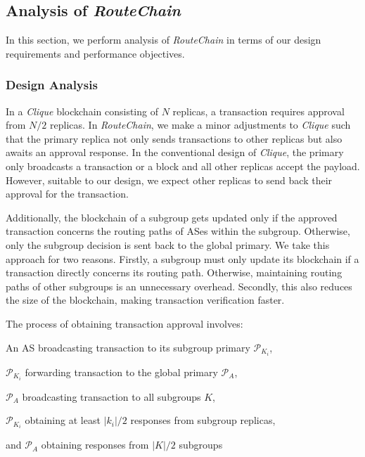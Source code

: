 \documentclass[conference]{IEEEtran}
\newcommand{\rc}{{{\em RouteChain}}\xspace}
\begin{document}
\subsection{Analysis of {\em RouteChain}} \label{sec:ana}
In this section, we perform analysis of \rc in terms of our design requirements and performance objectives. 
\subsubsection{Design Analysis}\label{sec:da}
In a {\em Clique} blockchain consisting of $N$ replicas, a transaction requires approval from $N/2$ replicas. In \rc, we make a minor adjustments to {\em Clique} such that the primary replica not only sends transactions to other replicas but also awaits an approval response. In the conventional design of {\em Clique}, the primary only broadcasts a transaction or a block and all other replicas accept the payload. However, suitable to our design, we expect other replicas to send back their approval for the transaction.

Additionally, the blockchain of a subgroup gets updated only if the approved transaction concerns the routing paths of ASes within the subgroup. Otherwise, only the subgroup decision is sent back to the global primary. We take this approach for two reasons. Firstly, a subgroup must only update its blockchain if a transaction directly concerns its routing path. Otherwise,  maintaining routing paths of other subgroups is an unnecessary overhead. Secondly, this also reduces the size of the blockchain, making transaction verification faster. 

The process of obtaining transaction approval involves:
\begin{enumerate*}
    \item An AS broadcasting transaction to its subgroup primary $\mathcal{P}_{K_{i}}$,
    \item $\mathcal{P}_{K_{i}}$ forwarding transaction to the global primary $\mathcal{P}_{A}$,
    \item $\mathcal{P}_{A}$ broadcasting transaction to all subgroups $K$, 
    \item $\mathcal{P}_{K_{i}}$ obtaining at least $|k_{i}|/2$ responses from subgroup replicas,
    \item and $\mathcal{P}_{A}$ obtaining responses from $|K|/2$ subgroups
\end{enumerate*}
\end{document}
